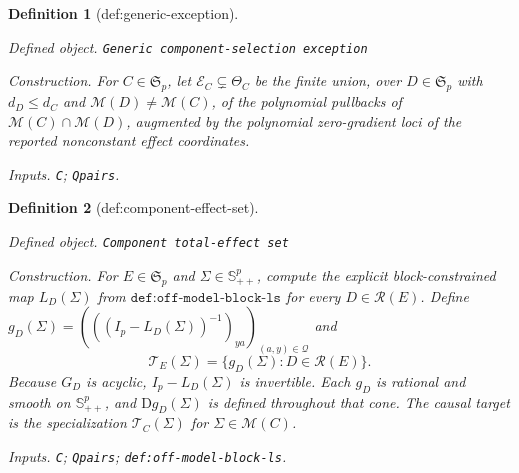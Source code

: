 \documentclass{article}
\newtheorem{definition}{Definition}
\begin{document}
\begin{definition}[def:generic-exception]\label{def:generic-exception}
\par\smallskip\noindent\emph{Defined object.} \texttt{Generic component-\allowbreak{}selection exception}
\par\smallskip\noindent\emph{Construction.} For \(C\in\mathfrak S_p\), let \(\mathcal E_C\subsetneq\Theta_C\) be the finite union, over \(D\in\mathfrak S_p\) with \(d_D\leq d_C\) and \(\mathcal M(D)\neq\mathcal M(C)\), of the polynomial pullbacks of \(\mathcal M(C)\cap\mathcal M(D)\), augmented by the polynomial zero-gradient loci of the reported nonconstant effect coordinates.
\par\smallskip\noindent\emph{Inputs.} \texttt{C}; \texttt{Qpairs}.
\end{definition}

\begin{definition}[def:component-effect-set]\label{def:component-effect-set}
\par\smallskip\noindent\emph{Defined object.} \texttt{Component total-\allowbreak{}effect set}
\par\smallskip\noindent\emph{Construction.} For \(E\in\mathfrak S_p\) and \(\Sigma\in\mathbb S^p_{++}\), compute the explicit block-constrained map \(L_D(\Sigma)\) from \(\texttt{def:off-model-block-ls}\) for every \(D\in\mathcal R(E)\). Define \(g_D(\Sigma)=(((I_p-L_D(\Sigma))^{-1})_{ya})_{(a,y)\in\mathcal Q}\) and \[\mathcal T_E(\Sigma)=\{g_D(\Sigma):D\in\mathcal R(E)\}.\] Because \(G_D\) is acyclic, \(I_p-L_D(\Sigma)\) is invertible. Each \(g_D\) is rational and smooth on \(\mathbb S^p_{++}\), and \(\mathrm Dg_D(\Sigma)\) is defined throughout that cone. The causal target is the specialization \(\mathcal T_C(\Sigma)\) for \(\Sigma\in\mathcal M(C)\).
\par\smallskip\noindent\emph{Inputs.} \texttt{C}; \texttt{Qpairs}; \texttt{def:\allowbreak{}off-\allowbreak{}model-\allowbreak{}block-\allowbreak{}ls}.
\end{definition}
\end{document}

